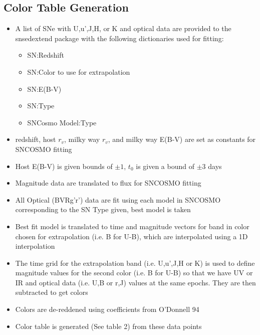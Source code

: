 \subsection{Color Table Generation}
\begin{itemize} 
\item A list of SNe with U,u',J,H, or K and optical data are provided to the snsedextend package with the following dictionaries used for fitting:
     \begin{itemize} 
        \item SN:Redshift
        \item SN:Color to use for extrapolation
        \item SN:E(B-V)
        \item SN:Type
        \item SNCosmo Model:Type
     \end{itemize}
\item redshift, host $r_v$, milky way $r_v$, and milky way E(B-V) are set as constants for SNCOSMO fitting
\item Host E(B-V) is given bounds of $\pm1$, $t_0$ is given a bound of $\pm3$ days
\item Magnitude data are translated to flux for SNCOSMO fitting
\item All Optical (BVRg'r') data are fit using each model in SNCOSMO corresponding to the SN Type given, best model is taken
\item Best fit model is translated to time and magnitude vectors for band in color chosen for extrapolation (i.e. B for U-B), which are interpolated using a 1D interpolation
\item The time grid for the extrapolation band (i.e. U,u',J,H or K) is used to define magnitude values for the second color (i.e. B for U-B) so that we have UV or IR and optical data (i.e. U,B or r,J) values at the same epochs. They are then subtracted to get colors
\item Colors are de-reddened using coefficients from O'Donnell 94
\item Color table is generated (See table 2) from these data points
\end{itemize}

